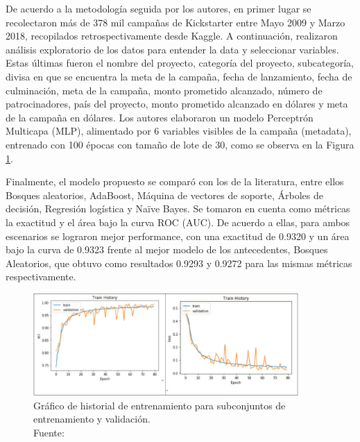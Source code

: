 De acuerdo a la metodología seguida por los autores, en primer lugar se recolectaron más de 378 mil campañas de Kickstarter entre Mayo 2009 y Marzo 2018, recopilados retrospectivamente desde Kaggle. A continuación, realizaron análisis exploratorio de los datos para entender la data y seleccionar variables. Estas últimas fueron el nombre del proyecto, categoría del proyecto, subcategoría, divisa en que se encuentra la meta de la campaña, fecha de lanzamiento, fecha de culminación, meta de la campaña, monto prometido alcanzado, número de patrocinadores, país del proyecto, monto prometido alcanzado en dólares y meta de la campaña en dólares. Los autores elaboraron un modelo Perceptrón Multicapa (MLP), alimentado por 6 variables visibles de la campaña (metadata), entrenado con 100 épocas con tamaño de lote de 30, como se observa en la Figura \ref{2:fig122}.

Finalmente, el modelo propuesto se comparó con los de la literatura, entre ellos Bosques aleatorios, AdaBoost, Máquina de vectores de soporte, Árboles de decisión, Regresión logística y Naïve Bayes.
Se tomaron en cuenta como métricas la exactitud y el área bajo la curva ROC (AUC). De acuerdo a ellas, para ambos escenarios se lograron mejor performance, con una exactitud de 0.9320 y un área bajo la curva de 0.9323 frente al mejor modelo de los antecedentes, Bosques Aleatorios, que obtuvo como resultados 0.9293 y 0.9272 para las mismas métricas respectivamente.

\begin{figure}[!ht]
	\begin{center}
		\includegraphics[width=0.90\textwidth]{2/figures/yu2018.jpg}
		\caption[Gráfico de historial de entrenamiento para subconjuntos de entrenamiento y validación]{Gráfico de historial de entrenamiento para subconjuntos de entrenamiento y validación.\\
			Fuente: \cite{pr_yu2018deeplearning}}
		\label{2:fig122}
	\end{center}
\end{figure}

